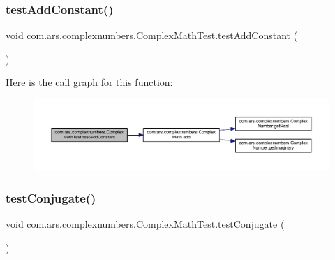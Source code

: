 \subsubsection{\texorpdfstring{test\+Add\+Constant()}{testAddConstant()}}
{\footnotesize\ttfamily void com.\+ars.\+complexnumbers.\+Complex\+Math\+Test.\+test\+Add\+Constant (\begin{DoxyParamCaption}{ }\end{DoxyParamCaption})}

Here is the call graph for this function\+:\nopagebreak
\begin{figure}[H]
\begin{center}
\leavevmode
\includegraphics[width=350pt]{classcom_1_1ars_1_1complexnumbers_1_1_complex_math_test_a0dba8a864962376e684cfcbc1baa80f4_cgraph}
\end{center}
\end{figure}
\hypertarget{classcom_1_1ars_1_1complexnumbers_1_1_complex_math_test_a29817014ba09b1d2f985882ddfcbfae2}{}\label{classcom_1_1ars_1_1complexnumbers_1_1_complex_math_test_a29817014ba09b1d2f985882ddfcbfae2} 
\subsubsection{\texorpdfstring{test\+Conjugate()}{testConjugate()}}
{\footnotesize\ttfamily void com.\+ars.\+complexnumbers.\+Complex\+Math\+Test.\+test\+Conjugate (\begin{DoxyParamCaption}{ }\end{DoxyParamCaption})}

